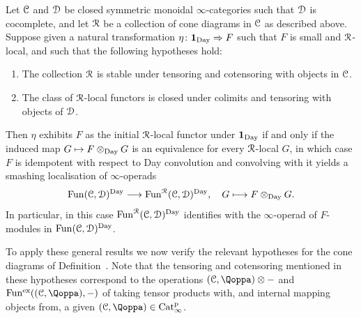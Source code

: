 \begin{proposition}
\label{proposition:sample-day-smashing}%
Let $\mathcal C$ and $\mathcal{D}$ be closed symmetric monoidal $\infty$-categories %
such that $\mathcal{D}$ is cocomplete, %
and let $\mathcal{R}$ be a collection of cone diagrams in $\mathcal C$ as described above. 
Suppose given a natural transformation $\eta\colon \mathbf{1}_{\mathrm{Day}} \Rightarrow F$ 
such that $F$ is small and $\mathcal{R}$-local,
and such that the following hypotheses hold:
\begin{enumerate}
\item
The collection $\mathcal{R}$ is stable under tensoring and cotensoring with objects in $\mathcal C$. 
\item
The class of $\mathcal{R}$-local functors is closed under colimits and tensoring with objects of $\mathcal{D}$.
\end{enumerate}
Then $\eta$ exhibits $F$ as the initial $\mathcal{R}$-local functor under $\mathbf{1}_{\mathrm{Day}}$ if and only if the induced map $G \mapsto F \otimes_{\mathrm{Day}} G$ is an equivalence for every $\mathcal{R}$-local $G$, in which case
$F$ is idempotent with respect to Day convolution and convolving with it yields a smashing localisation of $\infty$-operads
\[
\operatorname{Fun}(\mathcal C,\mathcal{D})^{\mathrm{Day}} \longrightarrow \operatorname{Fun}^{\mathcal{R}}(\mathcal C,\mathcal{D})^{\mathrm{Day}}, \quad G \longmapsto F \otimes_{\mathrm{Day}} G .
\]
In particular, in this case $\operatorname{Fun}^{\mathcal{R}}(\mathcal C,\mathcal{D})^{\mathrm{Day}}$ identifies with the $\infty$-operad of $F$-modules in $\operatorname{Fun}(\mathcal C,\mathcal{D})^{\mathrm{Day}}$.
\end{proposition}


To apply these general results we now verify the relevant hypotheses for the cone diagrams of Definition~. Note that the tensoring and cotensoring mentioned in these hypotheses correspond to the operations $(\C,\QF) \otimes -$ and $\Funx((\C,\QF),-)$ of taking tensor products with, and internal mapping objects from, a given $(\C,\QF) \in \Catp$.  










